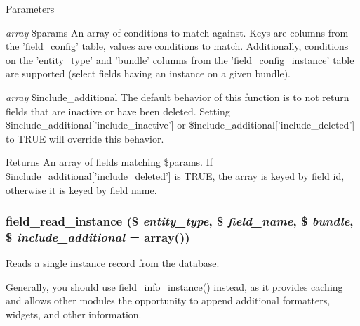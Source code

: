 \begin{DoxyParams}{Parameters}
\item[{\em array}]\$params An array of conditions to match against. Keys are columns from the 'field\_\-config' table, values are conditions to match. Additionally, conditions on the 'entity\_\-type' and 'bundle' columns from the 'field\_\-config\_\-instance' table are supported (select fields having an instance on a given bundle). \item[{\em array}]\$include\_\-additional The default behavior of this function is to not return fields that are inactive or have been deleted. Setting \$include\_\-additional\mbox{[}'include\_\-inactive'\mbox{]} or \$include\_\-additional\mbox{[}'include\_\-deleted'\mbox{]} to TRUE will override this behavior. \end{DoxyParams}
\begin{DoxyReturn}{Returns}
An array of fields matching \$params. If \$include\_\-additional\mbox{[}'include\_\-deleted'\mbox{]} is TRUE, the array is keyed by field id, otherwise it is keyed by field name. 
\end{DoxyReturn}
\hypertarget{group__field__crud_ga7adc13c0c90428380e99dd3a0dd07737}{
\subsubsection[{field\_\-read\_\-instance}]{\setlength{\rightskip}{0pt plus 5cm}field\_\-read\_\-instance (\$ {\em entity\_\-type}, \/  \$ {\em field\_\-name}, \/  \$ {\em bundle}, \/  \$ {\em include\_\-additional} = {\ttfamily array()})}}
\label{group__field__crud_ga7adc13c0c90428380e99dd3a0dd07737}
Reads a single instance record from the database.

Generally, you should use \hyperlink{group__field__info_ga7d4361ece7a9a8be980e3fd4a6307564}{field\_\-info\_\-instance()} instead, as it provides caching and allows other modules the opportunity to append additional formatters, widgets, and other information.


